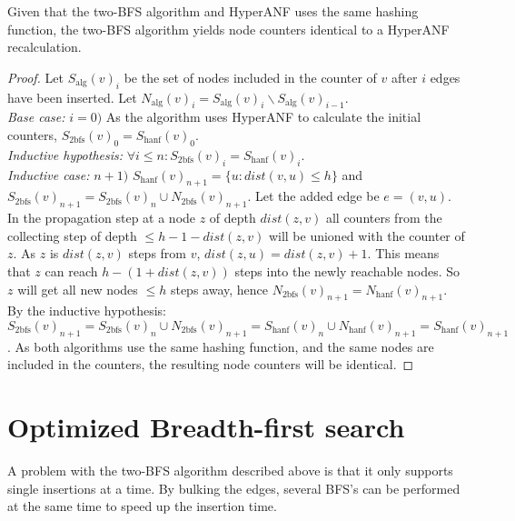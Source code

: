 \begin{theorem} Given that the two-BFS algorithm and HyperANF uses the same hashing function, the two-BFS algorithm yields node counters identical to a HyperANF recalculation.

\begin{proof}Let $S_\text{alg}(v)_i$ be the set of nodes included in the counter of $v$ after $i$ edges have been inserted. Let $N_\text{alg}(v)_i = S_\text{alg}(v)_i \backslash S_\text{alg}(v)_{i-1}$.\\

\noindent\textit{Base case:} $i = 0)$ As the algorithm uses HyperANF to calculate the initial counters, $S_\text{2bfs}(v)_0 = S_\text{hanf}(v)_0$.\\

\noindent\textit{Inductive hypothesis: } $\forall i \leq n : S_\text{2bfs}(v)_i = S_\text{hanf}(v)_i$.\\

\noindent\textit{Inductive case: } $n + 1)$  $S_\text{hanf}(v)_{n+1} = \{ u : dist(v,u) \leq h \}$ and $S_\text{2bfs}(v)_{n+1} = S_\text{2bfs}(v)_{n} \cup N_\text{2bfs}(v)_{n+1}$. Let the added edge be $e = (v,u)$. In the propagation step at a node $z$ of depth $dist(z,v)$ all counters from the collecting step of depth $\leq h-1-dist(z,v)$ will be unioned with the counter of $z$. As $z$ is $dist(z,v)$ steps from $v$, $dist(z,u) = dist(z,v) + 1$. This means that $z$ can reach $h-(1+dist(z,v))$ steps into the newly reachable nodes. So $z$ will get all new nodes $\leq h$ steps away, hence $N_\text{2bfs}(v)_{n+1} = N_\text{hanf}(v)_{n+1}$. By the inductive hypothesis: $S_\text{2bfs}(v)_{n+1} = S_\text{2bfs}(v)_n \cup N_\text{2bfs}(v)_{n+1} = S_\text{hanf}(v)_n \cup N_\text{hanf}(v)_{n+1} = S_\text{hanf}(v)_{n+1}$. As both algorithms use the same hashing function, and the same nodes are included in the counters, the resulting node counters will be identical.

\end{proof}
\end{theorem}

\section{Optimized Breadth-first search}

A problem with the two-BFS algorithm described above is that it only supports single insertions at a time. By bulking the edges, several BFS's can be performed at the same time to speed up the insertion time. 

